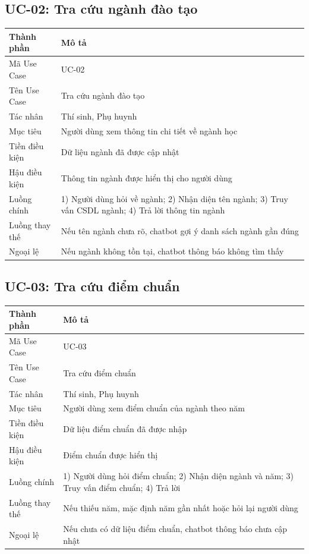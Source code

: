 \documentclass[12pt,a4paper]{report}
\begin{document}
\subsection{UC-02: Tra cứu ngành đào tạo}
\begin{table}[H]
\centering
\begin{tabular}{|p{3.5cm}|p{8.5cm}|}
\hline
\textbf{Thành phần} & \textbf{Mô tả} \\ \hline
Mã Use Case & UC-02 \\ \hline
Tên Use Case & Tra cứu ngành đào tạo \\ \hline
Tác nhân & Thí sinh, Phụ huynh \\ \hline
Mục tiêu & Người dùng xem thông tin chi tiết về ngành học \\ \hline
Tiền điều kiện & Dữ liệu ngành đã được cập nhật \\ \hline
Hậu điều kiện & Thông tin ngành được hiển thị cho người dùng \\ \hline
Luồng chính & 1) Người dùng hỏi về ngành; 2) Nhận diện tên ngành; 3) Truy vấn CSDL ngành; 4) Trả lời thông tin ngành \\ \hline
Luồng thay thế & Nếu tên ngành chưa rõ, chatbot gợi ý danh sách ngành gần đúng \\ \hline
Ngoại lệ & Nếu ngành không tồn tại, chatbot thông báo không tìm thấy \\ \hline
\end{tabular}
\end{table}

\subsection{UC-03: Tra cứu điểm chuẩn}
\begin{table}[H]
\centering
\begin{tabular}{|p{3.5cm}|p{8.5cm}|}
\hline
\textbf{Thành phần} & \textbf{Mô tả} \\ \hline
Mã Use Case & UC-03 \\ \hline
Tên Use Case & Tra cứu điểm chuẩn \\ \hline
Tác nhân & Thí sinh, Phụ huynh \\ \hline
Mục tiêu & Người dùng xem điểm chuẩn của ngành theo năm \\ \hline
Tiền điều kiện & Dữ liệu điểm chuẩn đã được nhập \\ \hline
Hậu điều kiện & Điểm chuẩn được hiển thị \\ \hline
Luồng chính & 1) Người dùng hỏi điểm chuẩn; 2) Nhận diện ngành và năm; 3) Truy vấn điểm chuẩn; 4) Trả lời \\ \hline
Luồng thay thế & Nếu thiếu năm, mặc định năm gần nhất hoặc hỏi lại người dùng \\ \hline
Ngoại lệ & Nếu chưa có dữ liệu điểm chuẩn, chatbot thông báo chưa cập nhật \\ \hline
\end{tabular}
\end{table}
\end{document}

